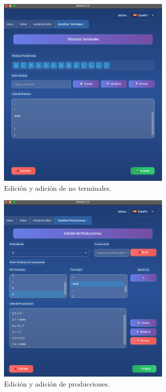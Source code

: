 \needspace{6cm}
\begin{figure}[H]
  \centering
  \includegraphics[width=0.75\textwidth]{figuras2/pruebas/editor/nuevos_no_term.png}
  \caption{Edición y adición de no terminales.}
\end{figure}

\needspace{6cm}
\begin{figure}[H]
  \centering
  \includegraphics[width=0.75\textwidth]{figuras2/pruebas/editor/nuevas_prod.png}
  \caption{Edición y adición de producciones.}
\end{figure}

